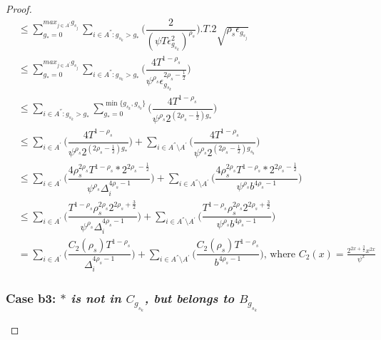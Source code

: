 \begin{proof}
\begin{align*}
 &\leq\sum_{g_{*}=0}^{max_{j\in A^{'}}g_{s_{j}}}\sum_{i\in A^{''}:g_{s_{k}}>g_{*}}\bigg(\dfrac{2}{(\psi T\epsilon_{g_{s_{k}}}^{2})^{\rho_{s}}} \bigg).T.2\sqrt{\rho_{s}\epsilon_{g_{s_{j}}}}\\
 &\leq\sum_{g_{*}=0}^{max_{j\in A^{'}}g_{s_{j}}}\sum_{i\in A^{''}:g_{s_{k}}>g_{*}}\bigg(\dfrac{4T^{1-\rho_{s}}}{\psi^{\rho_{s}}\epsilon_{g_{s_{k}}}^{2\rho_{s} - \frac{1}{2}}} \bigg)\\
 &\leq\sum_{i\in A^{''}:g_{s_{k}}>g_{*}}\sum_{g_{*}=0}^{\min{\lbrace g_{s_{k}},g_{s_{b}}\rbrace}}\bigg(\dfrac{4T^{1-\rho_{s}}}{\psi^{\rho_{s}}2^{({2\rho_{s} - \frac{1}{2}})g_{*}}} \bigg) \\
 &\leq\sum_{i\in A^{'}}\bigg(\dfrac{4T^{1-\rho_{s}}}{\psi^{\rho_{s}}2^{({2\rho_{s} - \frac{1}{2}})g_{*}}} \bigg)+\sum_{i\in A^{''}\setminus A^{'}}\bigg(\dfrac{4T^{1-\rho_{s}}}{\psi^{\rho_{s}}2^{({2\rho_{s} - \frac{1}{2}})g_{s_{b}}}} \bigg)\\ 
 &\leq\sum_{i\in A^{'}}\bigg(\dfrac{4\rho_{s}^{2\rho_{s}}T^{1-\rho_{s}}*2^{2\rho_{s}-\frac{1}{2}}}{\psi^{\rho_{s}}\Delta_{i}^{4\rho_{s}-1}} \bigg)+\sum_{i\in A^{''}\setminus A^{'}}\bigg(\dfrac{4\rho_{s}^{2\rho_{s}}T^{1-\rho_{s}}*2^{2\rho_{s}-\frac{1}{2}}}{\psi^{\rho_{s}}b^{4\rho_{s}-1}} \bigg)\\
 &\leq\sum_{i\in A^{'}}\bigg(\dfrac{T^{1-\rho_{s}}\rho_{s}^{2\rho_{s}}2^{2\rho_{s}+\frac{3}{2}}}{\psi^{\rho_{s}}\Delta_{i}^{4\rho_{s}-1}} \bigg)+\sum_{i\in A^{''}\setminus A^{'}}\bigg(\dfrac{T^{1-\rho_{s}}\rho_{s}^{2\rho_{s}}2^{2\rho_{s}+\frac{3}{2}}}{\psi^{\rho_{s}}b^{4\rho_{s}-1}} \bigg)\\
 & = \sum_{i\in A^{'}}\bigg(\dfrac{C_{2}(\rho_{s})T^{1-\rho_{s}}}{\Delta_{i}^{4\rho_{s}-1}} \bigg)+\sum_{i\in A^{''}\setminus A^{'}}\bigg(\dfrac{C_{2}(\rho_{s})T^{1-\rho_{s}}}{b^{4\rho_{s}-1}} \bigg) \text{, where } C_2(x) = \frac{2^{2x+\frac{3}{2}}x^{2x}}{\psi^{x}}
\end{align*}

\subsubsection*{Case b3: \textit{${*}$ is not in $C_{g_{s_{k}}}$, but belongs to $B_{g_{s_{k}}}$} } 


\end{proof}
